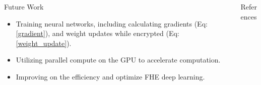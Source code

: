 \documentclass{beamer}
\begin{document}
\begin{frame}
\begin{columns}
\begin{column}{0.3\textwidth}
\begin{block}{Future Work}
          \begin{itemize}
            \item Training neural networks, including calculating gradients (Eq:\ref{gradient}), and weight updates while encrypted (Eq:\ref{weight_update}).
            \item Utilizing parallel compute on the GPU to accelerate computation.
            \item Improving on the efficiency and optimize FHE deep learning.
          \end{itemize}
        \end{block}
      \end{column}
      \begin{column}{0.3\textwidth}
        \begin{block}{References}
          \printbibliography
        \end{block}
      \end{column}
    \end{columns}
  \end{frame}
\end{document}
